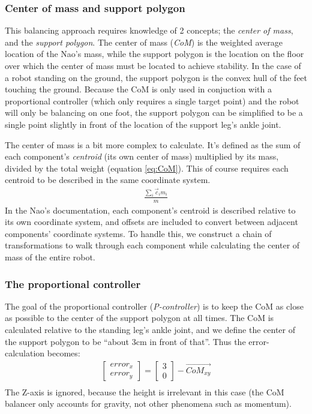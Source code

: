 \documentclass[a4paper]{article}
\begin{document}
\subsubsection{Center of mass and support polygon}
This balancing approach requires knowledge of 2 concepts; the \emph{center of mass},
and the \emph{support polygon}. The center of mass (\emph{CoM}) is the weighted average
location of the Nao’s mass, while the support polygon is the location on the
floor over which the center of mass must be located to achieve stability. In the
case of a robot standing on the ground, the support polygon is the convex hull
of the feet touching the ground. Because the CoM is only used in conjuction with
a proportional controller (which only requires a single target point) and the
robot will only be balancing on one foot, the support polygon can be simplified
to be a single point slightly in front of the location of the support leg's ankle
joint.

The center of mass is a bit more complex to calculate. It's defined as the sum
of each component’s \emph{centroid} (its own center of mass) multiplied by its
mass, divided by the total weight (equation \ref{eq:CoM}). This of course
requires each centroid to be described in the same coordinate system.
\begin{align}
  \frac{\sum_i \vec{c}_i m_i} {m}        \label{eq:CoM}
\end{align}
In the Nao’s documentation, each component's centroid is described relative to
its own coordinate system, and offsets are included to convert between adjacent
components’ coordinate systems. To handle this, we construct a chain of
transformations to walk through each component while calculating the center of
mass of the entire robot.

\subsubsection{The proportional controller}
The goal of the proportional controller (\emph{P-controller}) is to keep the
CoM as close as possible to the center of the support polygon at all times.
The CoM is calculated relative to the standing leg's ankle joint, and we define
the center of the support polygon to be ``about 3cm in front of that''. Thus the
error-calculation becomes:
\begin{align}
  \begin{bmatrix} error_x \\ error_y \end{bmatrix} = \begin{bmatrix} 3 \\ 0 \end{bmatrix} - \vec{CoM_{xy}} \\
\end{align}
The Z-axis is ignored, because the height is irrelevant in this case (the CoM
balancer only accounts for gravity, not other phenomena such as momentum).
\end{document}
